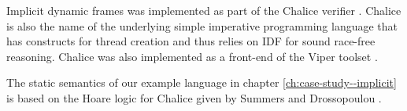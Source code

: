Implicit dynamic frames was implemented as part of the Chalice verifier \cite{leino2009verification}.
Chalice is also the name of the underlying simple imperative programming language that has constructs for thread creation and thus relies on IDF for sound race-free reasoning.
Chalice was also implemented as a front-end of the Viper toolset \cite{MuellerSchwerhoffSummers16}. %

The static semantics of our example language in chapter \ref{ch:case-study--implicit} is based on the Hoare logic for Chalice given by Summers and Drossopoulou \cite{summers2013formal}.


